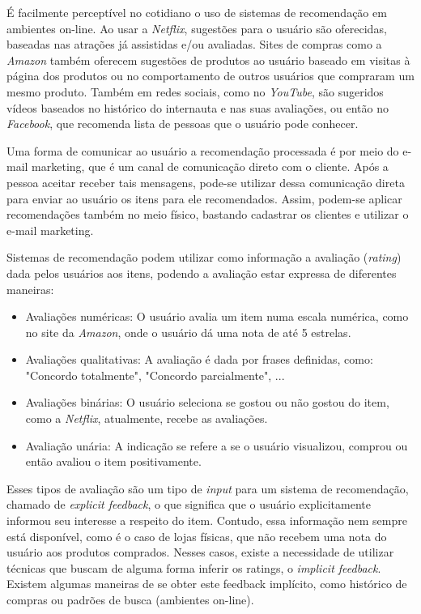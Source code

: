 \documentclass[12pt,a4paper,header]{abnt}
\begin{document}
É facilmente perceptível no cotidiano o uso de sistemas de recomendação em ambientes on-line. Ao usar a \textit{Netflix}, sugestões para o usuário são oferecidas, baseadas nas atrações já assistidas e/ou avaliadas. Sites de compras como a \textit{Amazon} também oferecem sugestões de produtos ao usuário baseado em visitas à página dos produtos ou no comportamento de outros usuários que compraram um mesmo produto. Também em redes sociais, como no \textit{YouTube}, são sugeridos vídeos baseados no histórico do internauta e nas suas avaliações, ou então no \textit{Facebook}, que recomenda lista de pessoas que o usuário pode conhecer\cite{gorakala2015building}.

Uma forma de comunicar ao usuário a recomendação processada é por meio do e-mail marketing, que é um canal de comunicação direto com o cliente\cite{takahashi2015estudo}. Após a pessoa aceitar receber tais mensagens, pode-se utilizar dessa comunicação direta para enviar ao usuário os itens para ele recomendados. Assim, podem-se aplicar recomendações também no meio físico, bastando cadastrar os clientes e utilizar o e-mail marketing.

Sistemas de recomendação podem utilizar como informação a avaliação (\textit{rating}) dada pelos usuários aos itens, podendo a avaliação estar expressa de diferentes maneiras\cite{shapira2011recommender}:

\begin{itemize}

\item Avaliações numéricas: O usuário avalia um item numa escala numérica, como no site da \textit{Amazon}, onde o usuário dá uma nota de até 5 estrelas.

\item Avaliações qualitativas: A avaliação é dada por frases definidas, como: "Concordo totalmente", "Concordo parcialmente", ...

\item Avaliações binárias: O usuário seleciona se gostou ou não gostou do item, como a \textit{Netflix}, atualmente, recebe as avaliações.

\item Avaliação unária: A indicação se refere a se o usuário visualizou, comprou ou então avaliou o item positivamente.

\end{itemize}

Esses tipos de avaliação são um tipo de \textit{input} para um sistema de recomendação, chamado de \textit{explicit feedback}, o que significa que o usuário explicitamente informou seu interesse a respeito do item. Contudo, essa informação nem sempre está disponível, como é o caso de lojas físicas, que não recebem uma nota do usuário aos produtos comprados. Nesses casos, existe a necessidade de  utilizar técnicas que buscam de alguma forma inferir os ratings, o \textit{implicit feedback}\cite{oard1998implicit}.  Existem algumas maneiras de se obter este feedback implícito, como histórico de compras ou padrões de busca (ambientes on-line)\cite{hu2008collaborative}.
\end{document}
